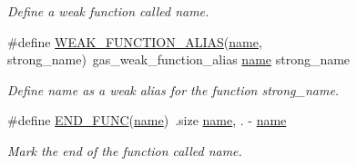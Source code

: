 \begin{DoxyCompactItemize}
\begin{DoxyCompactList}\small\item\em Define a weak function called {\itshape name}. \end{DoxyCompactList}\item 
\#define \hyperlink{group__assembler__group_ga43ce83c479dda75a6edadaa377ed817d}{W\-E\-A\-K\-\_\-\-F\-U\-N\-C\-T\-I\-O\-N\-\_\-\-A\-L\-I\-A\-S}(\hyperlink{gas_8h_a8cc72c7acb2e8c5a34a460a505fece93}{name}, strong\-\_\-name)~gas\-\_\-weak\-\_\-function\-\_\-alias \hyperlink{gas_8h_a8cc72c7acb2e8c5a34a460a505fece93}{name} strong\-\_\-name
\begin{DoxyCompactList}\small\item\em Define {\itshape name} as a weak alias for the function {\itshape strong\-\_\-name}. \end{DoxyCompactList}\item 
\#define \hyperlink{group__assembler__group_ga7a448fd290779d129685888f80cd76ff}{E\-N\-D\-\_\-\-F\-U\-N\-C}(\hyperlink{gas_8h_a8cc72c7acb2e8c5a34a460a505fece93}{name})~.size   \hyperlink{gas_8h_a8cc72c7acb2e8c5a34a460a505fece93}{name}, . -\/ \hyperlink{gas_8h_a8cc72c7acb2e8c5a34a460a505fece93}{name}
\begin{DoxyCompactList}\small\item\em Mark the end of the function called {\itshape name}. \end{DoxyCompactList}\end{DoxyCompactItemize}
